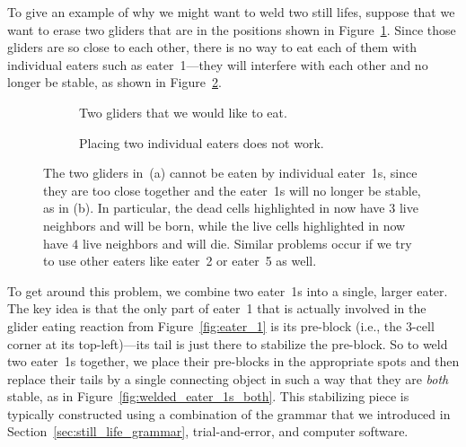 To give an example of why we might want to weld two still lifes, suppose that we want to erase two gliders that are in the positions shown in Figure~\ref{fig:unstable_eater_1s_a}. Since those gliders are so close to each other, there is no way to eat each of them with individual eaters such as eater~1---they will interfere with each other and no longer be stable, as shown in Figure~\ref{fig:unstable_eater_1s_b}.

\begin{figure}[!htb]
	\centering
	\begin{subfigure}{.47\textwidth}
		\centering
		\caption{Two gliders that we would like to eat.}
		\label{fig:unstable_eater_1s_a}
	\end{subfigure} \quad %
	\begin{subfigure}{.47\textwidth}
		\centering
		\caption{Placing two individual eaters does not work.}
		\label{fig:unstable_eater_1s_b}
	\end{subfigure}
	\caption{The two gliders in~(a) cannot be eaten by individual eater~1s, since they are too close together and the eater~1s will no longer be stable, as in (b). In particular, the dead cells highlighted in  now have $3$ live neighbors and will be born, while the live cells highlighted in  now have $4$ live neighbors and will die. Similar problems occur if we try to use other eaters like eater~2 or eater~5 as well.}\label{fig:unstable_eater_1s}
\end{figure}

To get around this problem, we combine two eater~1s into a single, larger eater. The key idea is that the only part of eater~1 that is actually involved in the glider eating reaction from Figure~\ref{fig:eater_1} is its pre-block (i.e., the $3$-cell corner at its top-left)---its tail is just there to stabilize the pre-block. So to weld two eater~1s together, we place their pre-blocks in the appropriate spots and then replace their tails by a single connecting object in such a way that they are \emph{both} stable, as in Figure~\ref{fig:welded_eater_1s_both}. This stabilizing piece is typically constructed using a combination of the grammar that we introduced in Section~\ref{sec:still_life_grammar}, trial-and-error, and computer software.

